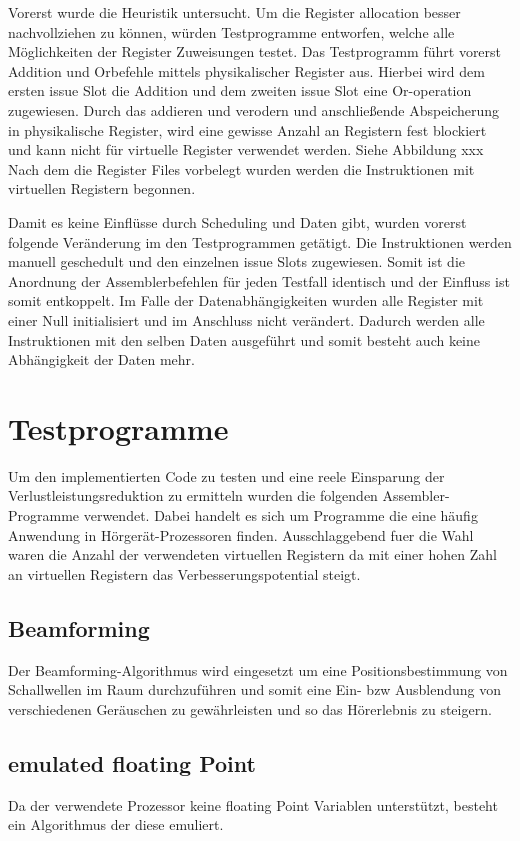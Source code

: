 Vorerst wurde die Heuristik untersucht.
Um die Register allocation besser nachvollziehen zu können, würden Testprogramme entworfen, welche alle Möglichkeiten der Register Zuweisungen testet. Das Testprogramm führt vorerst Addition und Orbefehle mittels physikalischer Register aus. Hierbei wird dem ersten issue Slot die Addition und dem zweiten issue Slot eine Or-operation zugewiesen. Durch das addieren und verodern und anschließende Abspeicherung in physikalische Register, wird eine gewisse Anzahl an Registern fest blockiert und kann nicht für virtuelle Register verwendet werden. Siehe Abbildung xxx
Nach dem die Register Files vorbelegt wurden werden die Instruktionen mit virtuellen Registern begonnen.

Damit es keine Einflüsse durch Scheduling und Daten gibt, wurden vorerst folgende Veränderung im den Testprogrammen getätigt. Die Instruktionen werden manuell geschedult und den einzelnen issue Slots zugewiesen. Somit ist die Anordnung der Assemblerbefehlen für jeden Testfall identisch und der Einfluss ist somit entkoppelt. Im Falle der Datenabhängigkeiten wurden alle Register mit einer Null initialisiert und im Anschluss nicht verändert. Dadurch werden alle Instruktionen mit den selben Daten ausgeführt und somit besteht auch keine Abhängigkeit der Daten mehr. 



\section{Testprogramme}
\label{sec:testprogamme}
Um den implementierten Code zu testen und eine reele Einsparung der Verlustleistungsreduktion zu ermitteln wurden die folgenden Assembler-Programme verwendet. Dabei handelt es sich um Programme die eine häufig Anwendung in Hörgerät-Prozessoren finden. Ausschlaggebend fuer die Wahl waren die Anzahl der verwendeten virtuellen Registern da mit einer hohen Zahl an virtuellen Registern das Verbesserungspotential steigt.
\subsection{Beamforming}
Der Beamforming-Algorithmus wird eingesetzt um eine Positionsbestimmung von Schallwellen im Raum durchzuführen und somit eine Ein- bzw Ausblendung von verschiedenen Geräuschen zu gewährleisten und so das Hörerlebnis zu steigern. 

\subsection{emulated floating Point}
Da der verwendete Prozessor keine floating Point Variablen unterstützt, besteht ein Algorithmus der diese emuliert. 

